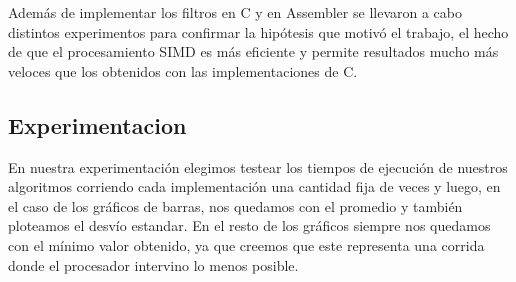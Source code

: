 \par{Además de implementar los filtros en C y en Assembler se llevaron a cabo distintos experimentos para confirmar la hipótesis que motivó el trabajo, el hecho de que el procesamiento SIMD es más eficiente y permite resultados mucho más veloces que los obtenidos con las implementaciones de C.}

\subsection{Experimentacion}
\par{En nuestra experimentación elegimos testear los tiempos de ejecución de nuestros algoritmos corriendo cada implementación una cantidad fija de veces y luego, en el caso de los gráficos de barras, nos quedamos con el promedio y también ploteamos el desvío estandar. En el resto de los gráficos siempre nos quedamos con el mínimo valor obtenido, ya que creemos que este representa una corrida donde el procesador intervino lo menos posible.}